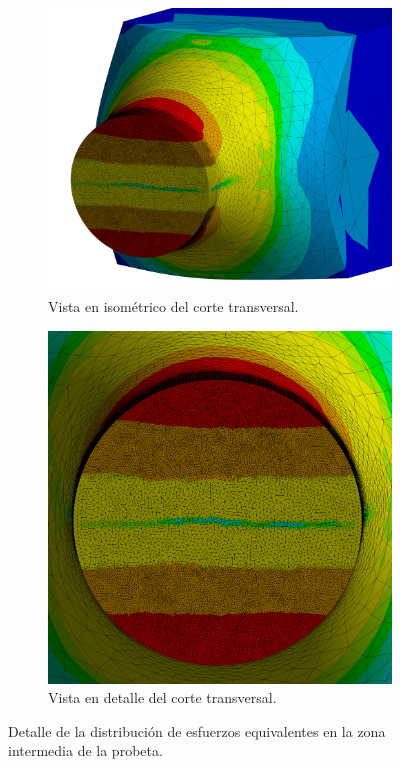 \begin{figure}[]
	\ContinuedFloat
	\centering
	\begin{subfigure}{0.6\linewidth}
		\centering
		\includegraphics[width=\linewidth]{Imagenes/rcorte_iso.png}
		\caption{Vista en isométrico del corte transversal.}
		\label{fig:rcorte_iso}
	\end{subfigure}		
	\begin{subfigure}{0.6\linewidth}
		\centering
		\includegraphics[width=\linewidth]{Imagenes/rcorte.png}
		\caption{Vista en detalle del corte transversal.}
		\label{fig:rcorte}
	\end{subfigure}
\caption{Detalle de la distribución de esfuerzos equivalentes en la zona intermedia de la probeta.}
\label{fig:resultados_vm}
\end{figure}


